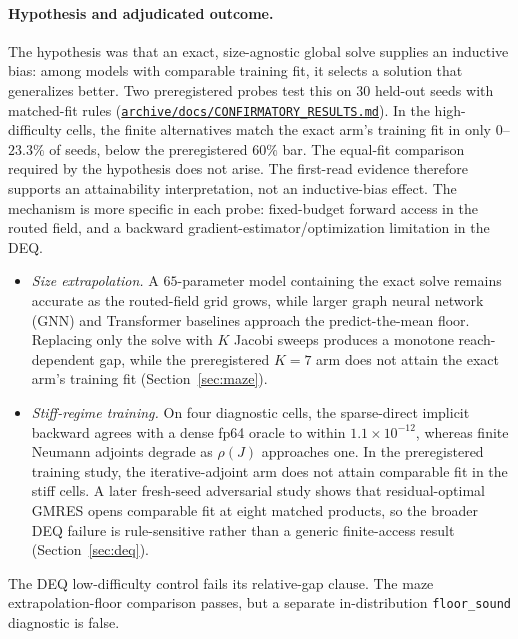 \paragraph{Hypothesis and adjudicated outcome.}
The hypothesis was that an exact, size-agnostic global solve supplies an
inductive bias: among models with comparable training fit, it selects a
solution that generalizes better. Two preregistered probes test this on
$30$ held-out seeds with matched-fit rules
(\href{https://github.com/vanshsehrawat14/gabp-sparse-inv/blob/main/archive/docs/CONFIRMATORY_RESULTS.md}
{\nolinkurl{archive/docs/CONFIRMATORY_RESULTS.md}}). In the high-difficulty cells,
the finite alternatives match the exact arm's training fit in only
$0$--$23.3\%$ of seeds, below the preregistered $60\%$ bar. The equal-fit
comparison required by the hypothesis does not arise. The first-read evidence
therefore supports an attainability interpretation, not an inductive-bias
effect. The mechanism is more specific in each probe: fixed-budget forward
access in the routed field, and a backward gradient-estimator/optimization
limitation in the DEQ.
\begin{itemize}
  \item \emph{Size extrapolation.} A $65$-parameter model containing the
        exact solve remains accurate as the routed-field grid grows, while
        larger graph neural network (GNN) and Transformer baselines approach
        the predict-the-mean
        floor. Replacing only the solve with $K$ Jacobi sweeps produces a
        monotone reach-dependent gap, while the preregistered $K=7$ arm
        does not attain the exact arm's training fit
        (Section~\ref{sec:maze}).
  \item \emph{Stiff-regime training.} On four diagnostic cells, the
        sparse-direct implicit backward agrees with a dense fp64 oracle to
        within $1.1\times10^{-12}$, whereas finite Neumann adjoints degrade
        as $\rho(J)$ approaches one. In the preregistered training study,
        the iterative-adjoint arm does not attain comparable fit in the
        stiff cells. A later fresh-seed adversarial study shows that
        residual-optimal GMRES opens comparable fit at eight matched products,
        so the broader DEQ failure is rule-sensitive rather than a generic
        finite-access result (Section~\ref{sec:deq}).
\end{itemize}
The DEQ low-difficulty control fails its relative-gap clause. The maze
extrapolation-floor comparison passes, but a separate in-distribution
\texttt{floor\_sound} diagnostic is false.

